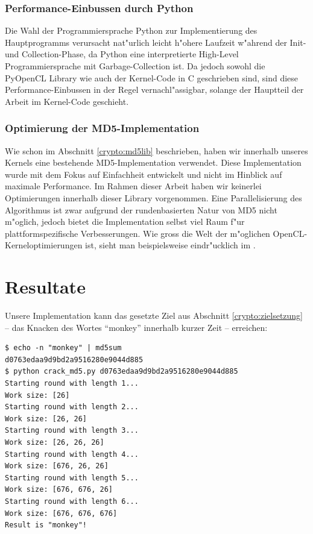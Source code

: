 \begin{refsection}
\subsubsection{Performance-Einbussen durch Python}

Die Wahl der Programmiersprache Python zur Implementierung des Hauptprogramms
verursacht nat"urlich leicht h"ohere Laufzeit w"ahrend der Init- und
Collection-Phase, da Python eine interpretierte High-Level Programmiersprache
mit Garbage-Collection ist. Da jedoch sowohl die PyOpenCL Library wie auch der
Kernel-Code in C geschrieben sind, sind diese Performance-Einbussen in der Regel
vernachl"assigbar, solange der Hauptteil der Arbeit im Kernel-Code geschieht.

\subsubsection{Optimierung der MD5-Implementation}

Wie schon im Abschnitt \ref{crypto:md5lib} beschrieben, haben wir innerhalb
unseres Kernels eine bestehende MD5-Implementation verwendet. Diese
Implementation wurde mit dem Fokus auf Einfachheit entwickelt und nicht im
Hinblick auf maximale Performance. Im Rahmen dieser Arbeit haben wir keinerlei
Optimierungen innerhalb dieser Library vorgenommen. Eine Parallelisierung des
Algorithmus ist zwar aufgrund der rundenbasierten Natur von MD5 nicht m"oglich,
jedoch bietet die Implementation selbst viel Raum f"ur plattformspezifische
Verbesserungen. Wie gross die Welt der m"oglichen OpenCL-Kerneloptimierungen
ist, sieht man beispielsweise eindr"ucklich im
 \cite{crypto:nvidia_bestpractices}.


\section{Resultate}

Unsere Implementation kann das gesetzte Ziel aus Abschnitt
\ref{crypto:zielsetzung} -- das Knacken des Wortes ``monkey'' innerhalb
kurzer Zeit -- erreichen:

\begin{small}
\begin{verbatim}
$ echo -n "monkey" | md5sum
d0763edaa9d9bd2a9516280e9044d885
$ python crack_md5.py d0763edaa9d9bd2a9516280e9044d885
Starting round with length 1...
Work size: [26]
Starting round with length 2...
Work size: [26, 26]
Starting round with length 3...
Work size: [26, 26, 26]
Starting round with length 4...
Work size: [676, 26, 26]
Starting round with length 5...
Work size: [676, 676, 26]
Starting round with length 6...
Work size: [676, 676, 676]
Result is "monkey"!


\end{verbatim}
\end{small}
\end{refsection}
